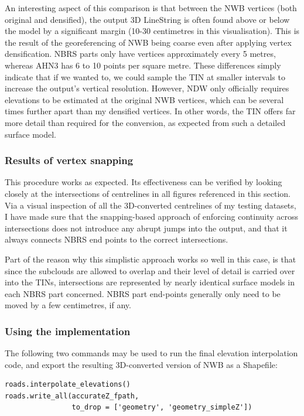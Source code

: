 An interesting aspect of this comparison is that between the NWB vertices (both original and densified), the output 3D LineString is often found above or below the model by a significant margin (10-30 centimetres in this visualisation). This is the result of the georeferencing of NWB being coarse even after applying vertex densification. NBRS parts only have vertices approximately every 5 metres, whereas AHN3 has 6 to 10 points per square metre. These differences simply indicate that if we wanted to, we could sample the TIN at smaller intervals to increase the output's vertical resolution. However, NDW only officially requires elevations to be estimated at the original NWB vertices, which can be several times further apart than my densified vertices. In other words, the TIN offers far more detail than required for the conversion, as expected from such a detailed surface model.

\subsubsection{Results of vertex snapping}

This procedure works as expected. Its effectiveness can be verified by looking closely at the intersections of centrelines in all figures referenced in this section. Via a visual inspection of all the 3D-converted centrelines of my testing datasets, 
I have made sure that the snapping-based approach of enforcing continuity across intersections does not introduce any abrupt jumps into the output, and that it always connects NBRS end points to the correct intersections.

Part of the reason why this simplistic approach works so well in this case, is that since the subclouds are allowed to overlap and their level of detail is carried over into the TINs, intersections are represented by nearly identical surface models in each NBRS part concerned. NBRS part end-points generally only need to be moved by a few centimetres, if any.

\subsubsection{Using the implementation}

The following two commands may be used to run the final elevation interpolation code, and export the resulting 3D-converted version of NWB as a Shapefile:

\begin{lstlisting}
roads.interpolate_elevations()
roads.write_all(accurateZ_fpath,
                to_drop = ['geometry', 'geometry_simpleZ'])
\end{lstlisting}

